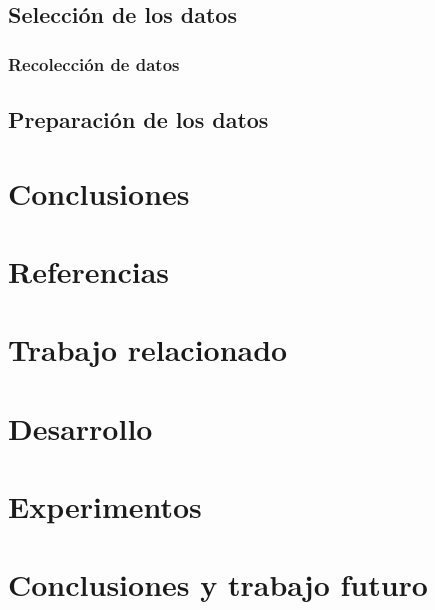 \section{Selección de los datos}
\subsection{Recolección de datos}

\section{Preparación de los datos}

\chapter{Conclusiones}

\chapter{Referencias}


\chapter{Trabajo relacionado}

\chapter{Desarrollo}

\chapter{Experimentos}

\chapter{Conclusiones y trabajo futuro}